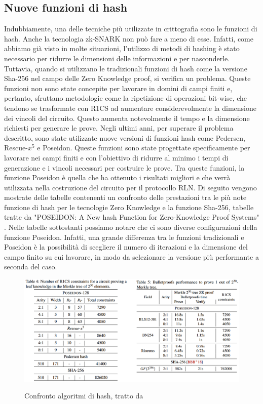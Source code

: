 \subsection{Nuove funzioni di hash}
Indubbiamente, una delle tecniche più utilizzate in crittografia sono le funzioni di hash. Anche la tecnologia zk-SNARK
non può fare a meno di esse. Infatti, come abbiamo già visto in molte situazioni, l'utilizzo di metodi di hashing è
stato necessario per ridurre le dimensioni delle informazioni e per nasconderle. Tuttavia, quando si utilizzano le
tradizionali funzioni di hash come la versione Sha-256 nel campo delle Zero Knowledge proof, si verifica un problema.
Queste funzioni non sono state concepite per lavorare in domini di campi finiti e, pertanto, sfruttano metodologie come
la ripetizione di operazioni bit-wise, che tendono se trasformate con R1CS ad aumentare considerevolmente la dimensione
dei vincoli del circuito. Questo aumenta notevolmente il tempo e la dimensione richiesti
per generare le prove. Negli ultimi anni, per superare il problema descritto, sono state utilizzate nuove versioni di
funzioni hash come Pedersen, Rescue-$x^5$ e Poseidon. Queste funzioni sono state progettate specificamente per lavorare nei
campi finiti e con l'obiettivo di ridurre al minimo i tempi di generazione e i vincoli necessari per costruire le prove.
Tra queste funzioni, la funzione Poseidon è quella che ha ottenuto i risultati migliori e che verrà utilizzata nella
costruzione del circuito per il protocollo RLN. Di seguito vengono mostrate delle tabelle contenenti un confronto delle
prestazioni tra le più note funzione di hash per le tecnologie Zero Knowledge e la funzione Sha-256, tabelle tratte da
"POSEIDON: A New hash Function for Zero-Knowledge Proof Systems" \cite{cryptoeprint:2019-458}. Nelle tabelle sottostanti
possiamo notare che ci sono diverse configurazioni della funzione Poseidon. Infatti, una grande differenza tra le
funzioni tradizionali e Poseidon è la possibilità di scegliere il numero di iterazioni e la dimensione del campo finito
su cui lavorare, in modo da selezionare la versione più performante a seconda del caso.\\
\begin{figure}[H]
    \centering
    \includegraphics[width=14cm]{./chapters/2.rln-protocol/images/3.poseidon_comparison.png}
    \label{fig:poseidon_comparison}
    \captionsetup{justification=centering}
    \caption{Confronto algoritmi di hash, tratto da \cite{cryptoeprint:2019-458}}
\end{figure}

